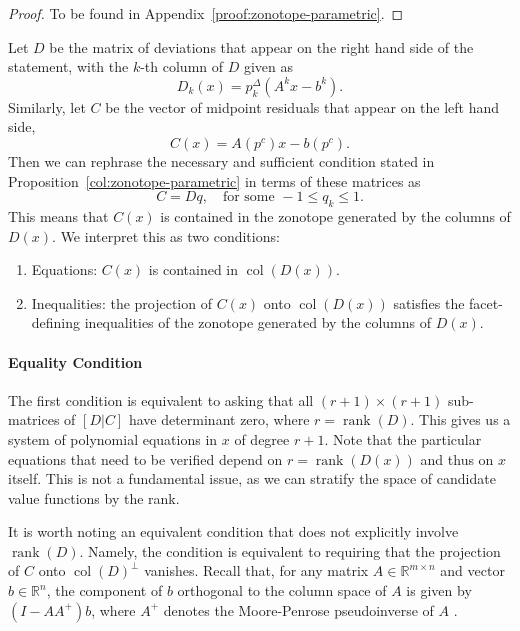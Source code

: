 \documentclass{article}
\theoremstyle{definition}
\theoremstyle{remark}
\newcommand{\rank}{\operatorname{rank}}
\begin{document}
\begin{proof}
    To be found in Appendix~\ref{proof:zonotope-parametric}.
\end{proof}

Let $D$ be the matrix of deviations that appear on the right hand side of the statement, with the $k$-th column of $D$ given as 
$$
D_k(x) = p_k^\Delta (A^kx-b^k).
$$
%
Similarly, let $C$ be the vector of midpoint residuals that appear on the left hand side, 
$$
C(x) = A(p^c)x - b(p^c).
$$
%
Then we can rephrase the necessary and sufficient condition stated in Proposition~\ref{col:zonotope-parametric} in terms of these matrices as 
\begin{equation} 
C = Dq, \quad \text{for some } -1 \leq q_k \leq 1. 
\end{equation} 
This means that $C(x)$ is contained in the zonotope generated by the columns of $D(x)$. 
%
We interpret this as two conditions: 
\begin{enumerate} 
    \item Equations: $C(x)$ is contained in $\operatorname{col}(D(x))$. 
    \item Inequalities: the projection of $C(x)$ onto $\operatorname{col}(D(x))$ satisfies the facet-defining inequalities of the zonotope generated by the columns of $D(x)$. 
\end{enumerate} 

\paragraph{Equality Condition}

The first condition is equivalent to 
asking that all $(r+1)\times (r+1)$ sub-matrices of $[D|C]$ have determinant zero, where $r = \operatorname{rank}(D)$. 
This gives us a system of polynomial equations in $x$ of degree %
$r+1$. Note that the particular equations that need to be verified depend on $r = \rank(D(x))$ and thus on $x$ itself. 
%
This is not a fundamental issue, as we can stratify the space of candidate value functions by the rank. 

It is worth noting an equivalent condition that does not explicitly involve $\operatorname{rank}(D)$. Namely, the condition is equivalent to requiring that the projection of  $C$ onto $\operatorname{col}(D)^\bot$ vanishes. Recall that, for any matrix $A \in \mathbb{R}^{m \times n}$ and vector $b \in \mathbb{R}^n$, the component of $b$ orthogonal to the column space of $A$ is given by $(I-AA^+)b$, where $A^+$ denotes the Moore-Penrose pseudoinverse of $A$ \citep[see, e.g.,][Theorem 6.69]{axler}. 
\end{document}
